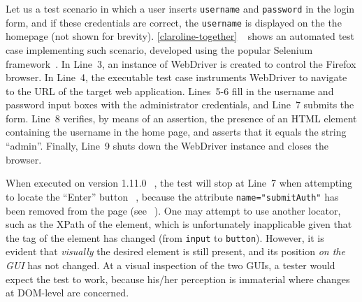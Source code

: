 Let us a test scenario in which a user 
inserts \texttt{username} and \texttt{password} 
in the login form, and if these credentials are correct, 
the \texttt{username} is displayed on the the homepage (not shown for brevity).
\autoref{claroline-together}~\textcircled{} shows an automated test case implementing such scenario, developed using the popular Selenium framework~\cite{selenium}.
In Line~3, an instance of WebDriver is created to control the Firefox browser. 
In Line~4, the executable test case instruments WebDriver to 
navigate to the URL of the target web application.  
Lines~5-6 fill in the username and password input boxes 
with the administrator credentials, and Line~7 submits the form. 
Line~8 verifies, by means of an assertion, the presence 
of an HTML element containing the username in the home page, 
and asserts that it equals the string ``admin''. 
Finally, Line~9 shuts down the WebDriver instance 
and closes the browser.

When executed on version 1.11.0~\textcircled{}, the test will stop at Line~7 when attempting to locate the ``Enter'' button~\textcircled{}, because the attribute \mbox{\texttt{name="submitAuth"}} has been removed from the page (see~\textcircled{}). One may attempt to use another locator, such as the XPath of the element, which is unfortunately inapplicable given that the tag of the element has changed (from \mbox{\texttt{input}} to \mbox{\texttt{button}}).
However, it is evident that \textit{visually} the desired element is still present, and its position \textit{on the GUI} has not changed. At a visual inspection of the two GUIs, a tester would expect the test to work, because his/her perception is immaterial where changes at DOM-level are concerned.


